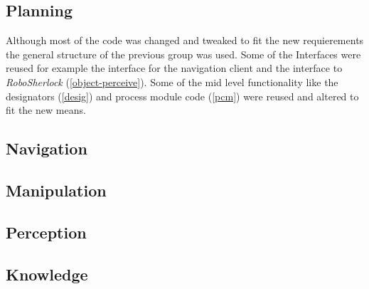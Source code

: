 \documentclass[main.tex]{subfiles}
\begin{document}
	\subsection{Planning}
		Although most of the code was changed and tweaked to fit the new requierements the general structure of the previous group was used. Some of the Interfaces were reused for example the interface for the navigation client and the interface to \textit{RoboSherlock} (\ref{object-perceive}). Some of the mid level functionality like the designators (\ref{desig}) and process module code (\ref{pcm}) were reused and altered to fit the new means.
	\subsection{Navigation}
	\subsection{Manipulation}
	\subsection{Perception}
	\subsection{Knowledge}
\end{document}
